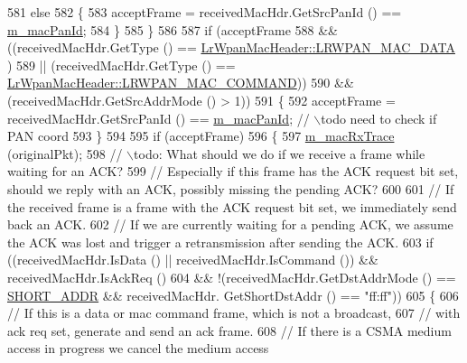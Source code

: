 \begin{DoxyCode}
581               \textcolor{keywordflow}{else}
582                 \{
583                   acceptFrame = receivedMacHdr.GetSrcPanId () == \hyperlink{classns3_1_1LrWpanMac_abb75c742ae20c41dd10a721605328a82}{m\_macPanId};
584                 \}
585             \}
586 
587           \textcolor{keywordflow}{if} (acceptFrame
588               && ((receivedMacHdr.GetType () == \hyperlink{classns3_1_1LrWpanMacHeader_a09363d4738e8ab00b82db8268b65d7a0a977c774a497fe1195b6c91c439e6b229}{LrWpanMacHeader::LRWPAN\_MAC\_DATA}
      )
589                   || (receivedMacHdr.GetType () == 
      \hyperlink{classns3_1_1LrWpanMacHeader_a09363d4738e8ab00b82db8268b65d7a0a52154bc6cb820dbba541d2330ce9ea7e}{LrWpanMacHeader::LRWPAN\_MAC\_COMMAND}))
590               && (receivedMacHdr.GetSrcAddrMode () > 1))
591             \{
592               acceptFrame = receivedMacHdr.GetSrcPanId () == \hyperlink{classns3_1_1LrWpanMac_abb75c742ae20c41dd10a721605328a82}{m\_macPanId}; \textcolor{comment}{// \(\backslash\)todo need to check
       if PAN coord}
593             \}
594 
595           \textcolor{keywordflow}{if} (acceptFrame)
596             \{
597               \hyperlink{classns3_1_1LrWpanMac_a38183ee976b61d2c93942250f5670b7c}{m\_macRxTrace} (originalPkt);
598               \textcolor{comment}{// \(\backslash\)todo: What should we do if we receive a frame while waiting for an ACK?}
599               \textcolor{comment}{//        Especially if this frame has the ACK request bit set, should we reply with an ACK,
       possibly missing the pending ACK?}
600 
601               \textcolor{comment}{// If the received frame is a frame with the ACK request bit set, we immediately send back an
       ACK.}
602               \textcolor{comment}{// If we are currently waiting for a pending ACK, we assume the ACK was lost and trigger a
       retransmission after sending the ACK.}
603               \textcolor{keywordflow}{if} ((receivedMacHdr.IsData () || receivedMacHdr.IsCommand ()) && receivedMacHdr.IsAckReq ()
604                   && !(receivedMacHdr.GetDstAddrMode () == \hyperlink{group__lr-wpan_gga9ea4702ab11d5329e1593afebce06bbba7bf58267dde39bdabfeeb5793450c5e3}{SHORT\_ADDR} && receivedMacHdr.
      GetShortDstAddr () == \textcolor{stringliteral}{"ff:ff"}))
605                 \{
606                   \textcolor{comment}{// If this is a data or mac command frame, which is not a broadcast,}
607                   \textcolor{comment}{// with ack req set, generate and send an ack frame.}
608                   \textcolor{comment}{// If there is a CSMA medium access in progress we cancel the medium access}

\end{DoxyCode}
